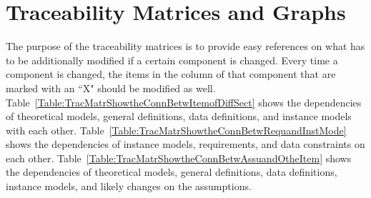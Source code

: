 \documentclass[12pt]{article}
\begin{document}
\section{Traceability Matrices and Graphs}
\label{Sec:TracMatrandGrap}
The purpose of the traceability matrices is to provide easy references on what has to be additionally modified if a certain component is changed. Every time a component is changed, the items in the column of that component that are marked with an ``X" should be modified as well. Table~\ref{Table:TracMatrShowtheConnBetwItemofDiffSect} shows the dependencies of theoretical models, general definitions, data definitions, and instance models with each other. Table~\ref{Table:TracMatrShowtheConnBetwRequandInstMode} shows the dependencies of instance models, requirements, and data constraints on each other. Table~\ref{Table:TracMatrShowtheConnBetwAssuandOtheItem} shows the dependencies of theoretical models, general definitions, data definitions, instance models, and likely changes on the assumptions.
\end{document}
